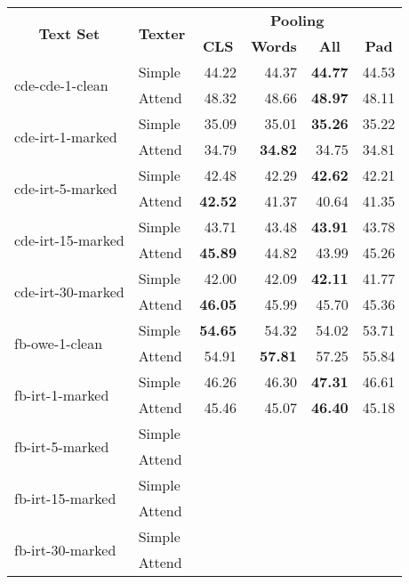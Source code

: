 \begin{tabular}{| l | l | r | r | r | r |}
    \hline

    \multicolumn{1}{|c|}{\multirow{2}{*}{\textbf{Text Set}}} &
    \multicolumn{1}{|c|}{\multirow{2}{*}{\textbf{Texter}}} &
    \multicolumn{4}{|c|}{\textbf{Pooling}} \\

    &
    &
    \multicolumn{1}{|c|}{\textbf{CLS}} &
    \multicolumn{1}{|c|}{\textbf{Words}} &
    \multicolumn{1}{|c|}{\textbf{All}} &
    \multicolumn{1}{|c|}{\textbf{Pad}} \\

    \hline \hline

    \multirow{2}{*}{cde-cde-1-clean}
    & Simple & 44.22 & 44.37 & \textbf{44.77} & 44.53 \\
    & Attend & 48.32 & 48.66 & \textbf{48.97} & 48.11 \\ \hline

    \multirow{2}{*}{cde-irt-1-marked}
    & Simple & 35.09 & 35.01 & \textbf{35.26} & 35.22 \\
    & Attend & 34.79 & \textbf{34.82} & 34.75 & 34.81 \\ \hline

    \multirow{2}{*}{cde-irt-5-marked}
    & Simple & 42.48 & 42.29 & \textbf{42.62} & 42.21 \\
    & Attend & \textbf{42.52} & 41.37 & 40.64 & 41.35 \\ \hline

    \multirow{2}{*}{cde-irt-15-marked}
    & Simple & 43.71 & 43.48 & \textbf{43.91} & 43.78 \\
    & Attend & \textbf{45.89} & 44.82 & 43.99 & 45.26 \\ \hline

    \multirow{2}{*}{cde-irt-30-marked}
    & Simple & 42.00 & 42.09 & \textbf{42.11} & 41.77 \\
    & Attend & \textbf{46.05} & 45.99 & 45.70 & 45.36 \\ \hline \hline

    \multirow{2}{*}{fb-owe-1-clean}
    & Simple & \textbf{54.65} & 54.32 & 54.02 & 53.71 \\
    & Attend & 54.91 & \textbf{57.81} & 57.25 & 55.84 \\ \hline

    \multirow{2}{*}{fb-irt-1-marked}
    & Simple & 46.26 & 46.30 & \textbf{47.31} & 46.61 \\
    & Attend & 45.46 & 45.07 & \textbf{46.40} & 45.18 \\ \hline

    \multirow{2}{*}{fb-irt-5-marked}
    & Simple &  &  &  &  \\
    & Attend &  &  &  &  \\ \hline

    \multirow{2}{*}{fb-irt-15-marked}
    & Simple &  &  &  &  \\
    & Attend &  &  &  &  \\ \hline

    \multirow{2}{*}{fb-irt-30-marked}
    & Simple &  &  &  &  \\
    & Attend &  &  &  &  \\ \hline

\end{tabular}
